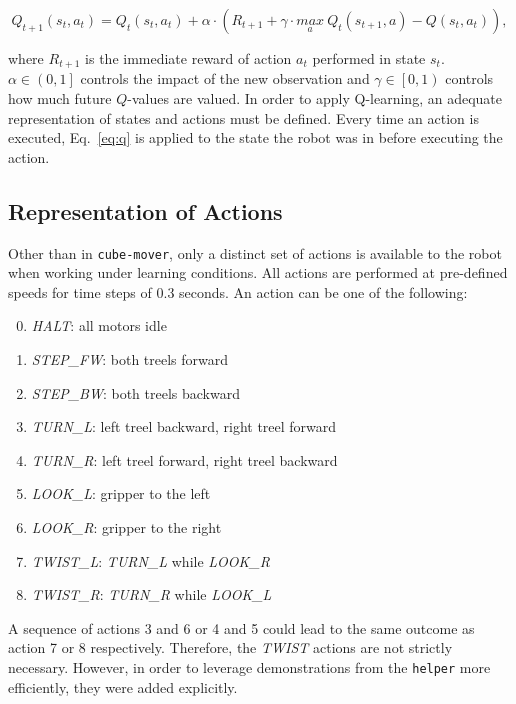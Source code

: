 \begin{equation}
    Q_{t+1}(s_t, a_t) = Q_t(s_t, a_t) + \alpha \cdot \left( R_{t+1} + \gamma \cdot \underset{a}{max} \: Q_t(s_{t+1}, a) - Q(s_t, a_t) \right),
    \label{eq:q}
\end{equation}

where $R_{t+1}$ is the immediate reward of action $a_t$ performed in state $s_t$. $\alpha \in \left(0,1\right]$ controls the impact of the new observation and $\gamma \in \left[0,1\right)$ controls how much future $Q$-values are valued. In order to apply Q-learning, an adequate representation of states and actions must be defined. Every time an action is executed, Eq.~\eqref{eq:q} is applied to the state the robot was in before executing the action.

\subsection{Representation of Actions}
Other than in \texttt{cube-mover}, only a distinct set of actions is available to the robot when working under learning conditions. All actions are performed at pre-defined speeds for time steps of 0.3 seconds. An action can be one of the following:

\begin{enumerate}
\setcounter{enumi}{-1}
    \item \textit{HALT}: all motors idle
    \item \textit{STEP\_FW}: both treels forward
    \item \textit{STEP\_BW}: both treels backward
    \item \textit{TURN\_L}: left treel backward, right treel forward
    \item \textit{TURN\_R}: left treel forward, right treel backward
    \item \textit{LOOK\_L}: gripper to the left
    \item \textit{LOOK\_R}: gripper to the right
    \item \textit{TWIST\_L}: \textit{TURN\_L} while \textit{LOOK\_R}
    \item \textit{TWIST\_R}: \textit{TURN\_R} while \textit{LOOK\_L}
\end{enumerate}

A sequence of actions 3 and 6 or 4 and 5 could lead to the same outcome as action 7 or 8 respectively. Therefore, the \textit{TWIST} actions are not strictly necessary. However, in order to leverage demonstrations from the \texttt{helper} more efficiently, they were added explicitly.

